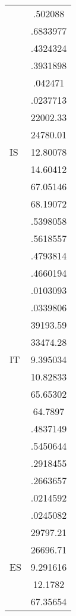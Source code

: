 {\begin{tabular}{l*{1}{c}}
                    &     .502088\\
                    &    .6833977\\
                    &    .4324324\\
                    &    .3931898\\
                    &     .042471\\
                    &    .0237713\\
                    &    22002.33\\
                    &    24780.01\\
IS                  &    12.80078\\
                    &    14.60412\\
                    &    67.05146\\
                    &    68.19072\\
                    &    .5398058\\
                    &    .5618557\\
                    &    .4793814\\
                    &    .4660194\\
                    &    .0103093\\
                    &    .0339806\\
                    &    39193.59\\
                    &    33474.28\\
IT                  &    9.395034\\
                    &    10.82833\\
                    &    65.65302\\
                    &     64.7897\\
                    &    .4837149\\
                    &    .5450644\\
                    &    .2918455\\
                    &    .2663657\\
                    &    .0214592\\
                    &    .0245082\\
                    &    29797.21\\
                    &    26696.71\\
ES                  &    9.291616\\
                    &     12.1782\\
                    &    67.35654\\

\end{tabular}}
